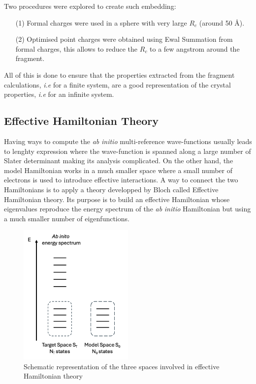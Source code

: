 \documentclass[12pt]{report}
\numberwithin{equation}{section}
\begin{document}
Two procedures were explored to create such embedding:
\begin{itemize}
    \item[(1)] Formal charges were used in a sphere with very large $R_c$ (around 50 \AA{}).
    \item[(2)] Optimised point charges were obtained using Ewal Summation from formal charges, this allows to reduce the $R_c$ to a few angstrom around the fragment.
\end{itemize}

All of this is done to ensure that the properties extracted from the fragment calculations, \textit{i.e} for a finite system, are a good representation of the crystal properties, \textit{i.e} for an infinite system.

\subsection{Effective Hamiltonian Theory}

Having ways to compute the \textit{ab} \textit{initio} multi-reference wave-functions usually leads to lenghty expression where the wave-function is spanned along a large number of Slater determinant making its analysis complicated.
On the other hand, the model Hamiltonian works in a much smaller space where a small number of electrons is used to introduce effective interactions.
A way to connect the two Hamiltonians is to apply a theory developped by Bloch called Effective Hamiltonian theory. 
Its purpose is to build an effective Hamiltonian whose eigenvalues reproduce the energy spectrum of the \textit{ab} \textit{initio} Hamiltonian but using a much smaller number of eigenfunctions.

\begin{figure}[!ht]
    \centering
    \includegraphics[width=0.5\textwidth]{Images/HEFF.png}
    \caption{Schematic representation of the three spaces involved in effective Hamiltonian theory}
    \label{fig:Heff}
\end{figure}
\end{document}
